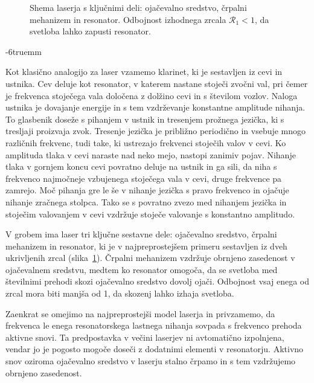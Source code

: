 \begin{figure}[h]
\centering
\def\svgwidth{90truemm} 

\caption{Shema laserja s ključnimi deli: ojačevalno sredstvo, črpalni mehanizem in resonator.
Odbojnost izhodnega zrcala $\mathcal{R}_1<1$, da svetloba lahko zapusti resonator.}
\label{fig:shemalaserja}
\end{figure}
\vglue-6truemm
\begin{remark}
Kot klasično analogijo za laser vzamemo klarinet, ki je sestavljen iz 
cevi in ustnika. Cev deluje kot resonator, v katerem nastane 
stoječi zvočni val, pri čemer je frekvenca stoječega vala določena z 
dolžino cevi in s številom vozlov. Naloga ustnika je dovajanje energije 
in s tem vzdrževanje konstantne amplitude nihanja. To glasbenik doseže s 
pihanjem v ustnik in tresenjem prožnega jezička, ki s tresljaji proizvaja 
zvok. Tresenje jezička je približno periodično in vsebuje mnogo različnih 
frekvenc, tudi take, ki ustrezajo frekvenci stoječih valov v cevi. 
Ko amplituda tlaka v cevi naraste nad neko mejo, nastopi zanimiv
pojav. Nihanje tlaka v gornjem koncu cevi povratno deluje na ustnik
in ga sili, da niha s frekvenco najmočneje vzbujenega stoječega vala v cevi,
druge frekvence pa zamrejo. Moč pihanja gre le še v
nihanje jezička s pravo frekvenco in ojačuje nihanje zračnega stolpca. 
Tako se s povratno zvezo med nihanjem jezička in stoječim valovanjem v cevi
vzdržuje stoječe valovanje s konstantno amplitudo. 
\end{remark}

V grobem ima laser tri ključne sestavne dele: ojačevalno sredstvo, 
črpalni mehanizem in resonator, ki je v najpreprostejšem primeru sestavljen iz dveh 
ukrivljenih zrcal (slika~\ref{fig:shemalaserja}). Črpalni 
mehanizem vzdržuje obrnjeno zasedenost v ojačevalnem sredstvu, medtem ko resonator 
omogoča, da se svetloba med številnimi prehodi skozi ojačevalno sredstvo dovolj ojači.
Odbojnost vsaj enega od zrcal 
mora biti manjša od 1, da skozenj lahko izhaja svetloba.

Zaenkrat se omejimo na najpreprostejši model laserja in 
privzamemo, da frekvenca le enega resonatorskega lastnega nihanja sovpada s 
frekvenco prehoda aktivne snovi. Ta predpostavka v večini laserjev ni
avtomatično izpolnjena, vendar jo je pogosto mogoče doseči z dodatnimi elementi 
v resonatorju. Aktivno snov oziroma ojačevalno sredstvo v laserju stalno 
črpamo in s tem vzdržujemo obrnjeno zasedenost. 

